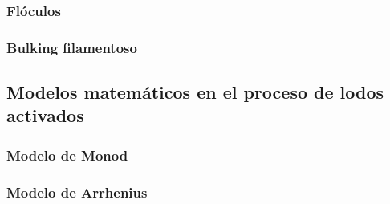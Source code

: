 \subsubsection{Flóculos}
\subsubsection{Bulking filamentoso}
\subsection{Modelos matemáticos en el proceso de lodos activados}
\subsubsection{Modelo de Monod}
\subsubsection{Modelo de Arrhenius}
